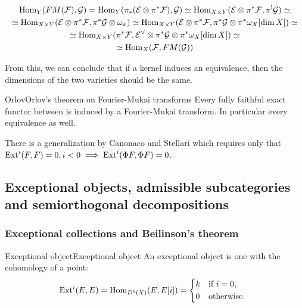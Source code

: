 $$\begin{gathered}
\operatorname{Hom}_{Y}(FM(\mathcal{F}), \mathcal{G})=\operatorname{Hom}_{Y} (\pi_{*} (\mathcal{E} \otimes \pi^* \mathcal{F}), \mathcal{G})\simeq \operatorname{Hom}_{X\times Y}(\mathcal{E}\otimes \pi^*\mathcal{F}, \pi^! \mathcal{G})\simeq \\ \simeq \operatorname{Hom}_{X\times Y}(\mathcal{E}\otimes \pi^*\mathcal{F}, \pi^*\mathcal{G}\otimes \omega_{\pi})\simeq \operatorname{Hom}_{X\times Y}(\mathcal{E}\otimes \pi^*\mathcal{F}, \pi^*\mathcal{G} \otimes \pi^* \omega_{X}[\dim X])\simeq \\ \simeq \operatorname{Hom}_{X\times Y}(\pi^*\mathcal{F}, \mathcal{E}^\vee\otimes \pi^*\mathcal{G} \otimes \pi^* \omega_{X}[\dim X])\simeq \\ \simeq \operatorname{Hom}_{X}(\mathcal{F}, FM(\mathcal{G}))
\end{gathered}$$

From this, we can conclude that if a kernel induces an equivalence, then the dimensions of the two varieties should be the same. 

\begin{theorem}{Orlov}{Orlov's theorem on Fourier-Mukai transforms}
Every fully faithful exact functor between is induced by a Fourier-Mukai transform. In particular every equivalence as well.
\end{theorem}
There is a generalization by Canonaco and Stellari which requires only that $\operatorname{Ext}^i(F,F)=0, i < 0 \implies \operatorname{Ext}^i(\Phi F,\Phi F)=0$.


\subsection{Exceptional objects, admissible subcategories and semiorthogonal decompositions}

\subsubsection{Exceptional collections and Beilinson's theorem}
\begin{definition}{Exceptional object}{Exceptional object}
    An exceptional object is one with the cohomology of a point:
    \begin{equation*}
        \Ext^i(E,E) = \Hom_{D^b(X)}(E,E[i]) = \begin{cases*}
            k & if $i=0$, \\
            0 & otherwise.
        \end{cases*}
    \end{equation*}
\end{definition}


